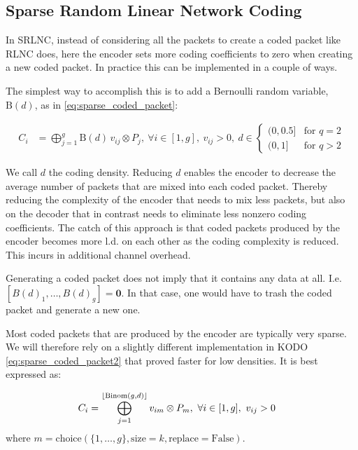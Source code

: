 \subsection{Sparse Random Linear Network Coding}

In \ac{SRLNC}, instead of considering all the packets to create a coded
packet like \ac{RLNC} does, here the encoder sets more coding coefficients to
zero when creating a new coded packet. In practice this can be implemented in
a couple of ways.

The simplest way to accomplish this is to add a Bernoulli random
variable, $\text{B}(d)$, as in \ref{eq:sparse_coded_packet}:

\begin{align} \label{eq:sparse_coded_packet}
    C_i  &= \bigoplus_{j=1}^{g} \text{B}(d) \, v_{ij} \otimes P_j ,\ \forall i \in [1,g] ,\
    v_{ij} > 0,\
    d \in
    \begin{cases}
        {(0,0.5]} & \text{for } q = 2 \\
        {(0,1]} & \text{for } q > 2
    \end{cases}
\end{align}

We call $d$ the coding density.
Reducing $d$ enables the encoder to decrease the average number of packets that
are mixed into each coded packet. Thereby reducing the complexity of the
encoder that needs to mix less packets, but also on the decoder that in
contrast needs to eliminate less nonzero coding coefficients. The catch of this
approach is that coded packets produced by the encoder becomes more \ac{l.d.}
on each other as the coding complexity is reduced. This incurs in additional
channel overhead.

Generating a coded packet does not imply that it contains any data at all. I.e.
$ \left[ B(d)_{1}, \ldots, B(d)_{g} \right] = \mathbf{0}$.
In that case, one would have to trash the coded packet and generate a new one.

Most coded packets that are produced by the encoder are typically very sparse.
We will therefore rely on a slightly different implementation in KODO
\ref{eq:sparse_coded_packet2} that proved faster for low densities. It is best
expressed as:

\begin{align} \label{eq:sparse_coded_packet2}
    C_i  &= \bigoplus_{j=1}^{\lfloor\text{Binom}(g,d)\rfloor} v_{im} \otimes P_{m} ,\
    \forall i \in [1,g] ,\
    v_{ij} > 0
\end{align}
where
$m = \text{choice}(\{1,\dots,g\}, \text{size}=k, \text{replace}=\text{False})$.


